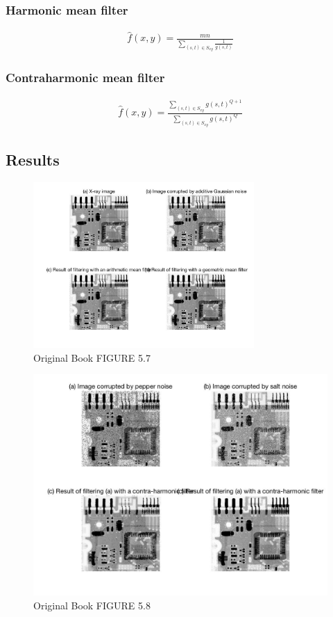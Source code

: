 \documentclass[11pt,oneside]{book}
\begin{document}
\subsubsection{Harmonic mean filter}
\begin{align}
\hat{f}(x,y) = \frac{mn}{\sum_{(s,t)\in S_{xy}}\frac{1}{g(s,t)}}
\end{align}
\subsubsection{Contraharmonic mean filter}
\begin{align}
\hat{f}(x,y) = \frac{\sum_{(s,t)\in S_{xy}}g(s,t)^{Q+1}}{\sum_{(s,t)\in S_{xy}}g(s,t)^Q}
\end{align}
\subsection{Results}
\begin{figure}[!htb]
   \centering  
   \includegraphics[width=0.75\textwidth]{images/4/mean1.jpg}
   \caption{Original Book FIGURE 5.7}
\end{figure}
\newpage
\begin{figure}[!htb]
   \centering  
   \includegraphics[width=1.0\textwidth]{images/4/mean2.jpg}
   \caption{Original Book FIGURE 5.8}
\end{figure}
\end{document}
